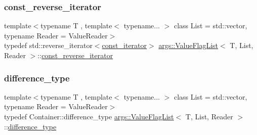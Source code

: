 \mbox{\label{classargs_1_1_value_flag_list_ad9e6a88cb6879a4a13cfef9b05309dbd}} 
\subsubsection{\texorpdfstring{const\+\_\+reverse\+\_\+iterator}{const\_reverse\_iterator}}
{\footnotesize\ttfamily template$<$typename T , template$<$ typename... $>$ class List = std\+::vector, typename Reader  = Value\+Reader$>$ \\
typedef std\+::reverse\+\_\+iterator$<$\hyperlink{classargs_1_1_value_flag_list_afc267bd3d85ff266eccf4b66cea4a274}{const\+\_\+iterator}$>$ \hyperlink{classargs_1_1_value_flag_list}{args\+::\+Value\+Flag\+List}$<$ T, List, Reader $>$\+::\hyperlink{classargs_1_1_value_flag_list_ad9e6a88cb6879a4a13cfef9b05309dbd}{const\+\_\+reverse\+\_\+iterator}}

\mbox{\label{classargs_1_1_value_flag_list_a05578e0b1d16bd55c40cc9368b0cf62a}} 
\subsubsection{\texorpdfstring{difference\+\_\+type}{difference\_type}}
{\footnotesize\ttfamily template$<$typename T , template$<$ typename... $>$ class List = std\+::vector, typename Reader  = Value\+Reader$>$ \\
typedef Container\+::difference\+\_\+type \hyperlink{classargs_1_1_value_flag_list}{args\+::\+Value\+Flag\+List}$<$ T, List, Reader $>$\+::\hyperlink{classargs_1_1_value_flag_list_a05578e0b1d16bd55c40cc9368b0cf62a}{difference\+\_\+type}}

\mbox{\label{classargs_1_1_value_flag_list_a4374b7a70c21c42d72912ec5ce323515}} 
